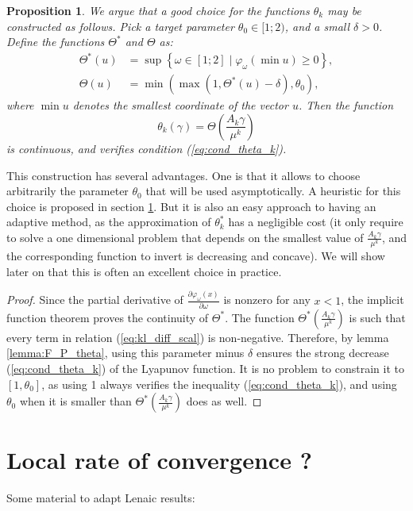 \documentclass{article} %
\theoremstyle{plain}
\newtheorem{proposition}{Proposition}
\theoremstyle{definition}
\theoremstyle{remark}
\begin{document}
\begin{proposition}
	We argue that a good choice for the functions $\theta_k$ may be constructed as follows. Pick a target parameter $\theta_0 \in [1;2)$, and a small $\delta>0$.
	Define the functions $\Theta^*$ and $\Theta$ as:
	\begin{align}
	\label{eq:Theta_opt}
	\Theta^*(u) &= \sup \left\{\omega \in [1;2]  \mid \varphi_\omega\left(\min u\right) \ge 0 \right\} ,\\
	\label{eq:Theta}
	\Theta(u) &= \min(\max(1,\Theta^*(u)-\delta),\theta_0),
	\end{align}
	where $\min u$ denotes the smallest coordinate of the vector $u$.
	Then the function
	\begin{equation}
	\label{eq:theta_k}
	\theta_k(\gamma) =\Theta\left (\frac{A_k \gamma}{\mu^k}\right)
	\end{equation}
	is continuous, and verifies condition (\ref{eq:cond_theta_k}).
\end{proposition}
This construction has several advantages.
One is that it allows to choose arbitrarily the parameter $\theta_0$ that will be used asymptotically. A heuristic for this choice is proposed in section \ref{section:local}.
But it is also an easy approach to having an adaptive method, as the approximation of $\theta_k^*$ has a negligible cost (it only require to solve a one dimensional problem that depends on the smallest value of $\frac{A_k \gamma}{\mu^k}$, and the corresponding function to invert is decreasing and concave).
We will show later on that this is often an excellent choice in practice.
\begin{proof}
	Since the partial derivative of $\frac{\partial\varphi_\omega(x)}{\partial\omega}$ is nonzero for any $x<1$, the implicit function theorem proves the continuity of $\Theta^*$.
	The function $\Theta^*\left(\frac{A_k \gamma}{\mu^k}\right)$ is such that every term in relation (\ref{eq:kl_diff_scal}) is non-negative.
	Therefore, by lemma \ref{lemma:F_P_theta}, using this parameter minus $\delta$ ensures the strong decrease (\ref{eq:cond_theta_k}) of the Lyapunov function.
	It is no problem to constrain it to $[1,\theta_0]$, as using 1 always verifies the inequality (\ref{eq:cond_theta_k}), and using $\theta_0$ when it is smaller than $\Theta^*\left(\frac{A_k \gamma}{\mu^k}\right)$ does as well.
\end{proof}

\section{Local rate of convergence ?}
\label{section:local}
Some material to adapt Lenaic results:
\end{document}
